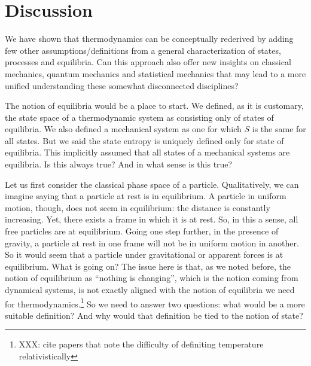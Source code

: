 \documentclass[letterpaper,twocolumn]{article}
\begin{document}


\section{Discussion}

We have shown that thermodynamics can be conceptually rederived by adding few other assumptions/definitions from a general characterization of states, processes and equilibria. Can this approach also offer new insights on classical mechanics, quantum mechanics and statistical mechanics that may lead to a more unified understanding these somewhat disconnected disciplines?

The notion of equilibria would be a place to start. We defined, as it is customary, the state space of a thermodynamic system as consisting only of states of equilibria. We also defined a mechanical system as one for which $S$ is the same for all states. But we said the state entropy is uniquely defined only for state of equilibria. This implicitly assumed that all states of a mechanical systems are equilibria. Is this always true? And in what sense is this true?

Let us first consider the classical phase space of a particle. Qualitatively, we can imagine saying that a particle at rest is in equilibrium. A particle in uniform motion, though, does not seem in equilibrium: the distance is constantly increasing. Yet, there exists a frame in which it is at rest. So, in this a sense, all free particles are at equilibrium. Going one step further, in the presence of gravity, a particle at rest in one frame will not be in uniform motion in another. So it would seem that a particle under gravitational or apparent forces is at equilibrium. What is going on?  The issue here is that, as we noted before, the notion of equilibrium as ``nothing is changing'', which is the notion coming from dynamical systems, is not exactly aligned with the notion of equilibria we need for thermodynamics.\footnote{XXX: cite papers that note the difficulty of definiting temperature relativistically} So we need to answer two questions: what would be a more suitable definition? And why would that definition be tied to the notion of state?
\end{document}

